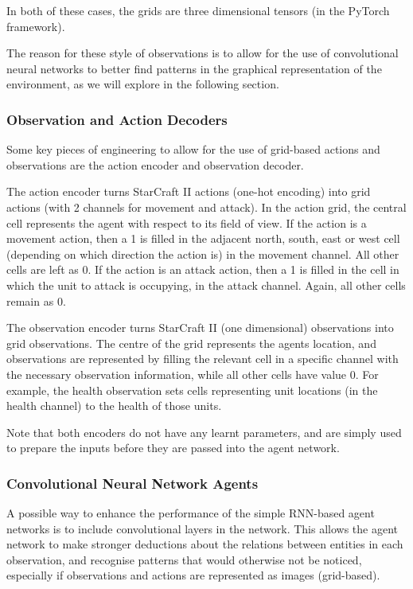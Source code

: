 In both of these cases, the grids are three dimensional tensors (in the PyTorch framework).

The reason for these style of observations is to allow for the use of convolutional neural networks to better find patterns in the graphical representation of the environment, as we will explore in the following section.

\subsubsection{Observation and Action Decoders}

Some key pieces of engineering to allow for the use of grid-based actions and observations are the action encoder and observation decoder. 

The action encoder turns StarCraft II actions (one-hot encoding) into grid actions (with 2 channels for movement and attack). In the action grid, the central cell represents the agent with respect to its field of view. If the action is a movement action, then a 1 is filled in the adjacent north, south, east or west cell (depending on which direction the action is) in the movement channel. All other cells are left as 0. If the action is an attack action, then a 1 is filled in the cell in which the unit to attack is occupying, in the attack channel. Again, all other cells remain as 0. 

The observation encoder turns StarCraft II (one dimensional) observations into grid observations. The centre of the grid represents the agents location, and observations are represented by filling the relevant cell in a specific channel with the necessary observation information, while all other cells have value 0. For example, the health observation sets cells representing unit locations (in the health channel) to the health of those units. 

Note that both encoders do not have any learnt parameters, and are simply used to prepare the inputs before they are passed into the agent network.

\subsubsection{Convolutional Neural Network Agents}

A possible way to enhance the performance of the simple RNN-based agent networks is to include convolutional layers in the network. This allows the agent network to make stronger deductions about the relations between entities in each observation, and recognise patterns that would otherwise not be noticed, especially if observations and actions are represented as images (grid-based). 

